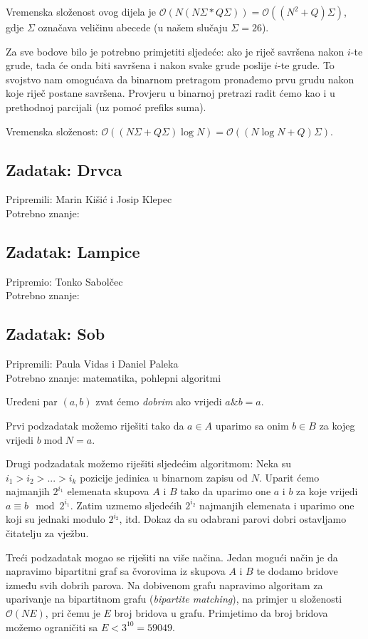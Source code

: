 \documentclass[a4paper]{article}
\begin{document}
Vremenska složenost ovog dijela je $\mathcal{O}(N(N\Sigma * Q\Sigma))=
\mathcal{O}((N^2 + Q)\Sigma)$, gdje $\Sigma$ označava veličinu abecede
(u našem slučaju $\Sigma=26$).

Za sve bodove bilo je potrebno primjetiti sljedeće: ako je riječ savršena nakon
$i$-te grude, tada će onda biti savršena i nakon svake grude poslije $i$-te
grude. To svojstvo nam omogućava da binarnom pretragom pronađemo prvu grudu
nakon koje riječ postane savršena. Provjeru u binarnoj pretrazi radit ćemo kao
i u prethodnoj parcijali (uz pomoć prefiks suma).

Vremenska složenost: $\mathcal{O}((N\Sigma + Q\Sigma)\log N) = \mathcal{O}((N \log N + Q)\Sigma)$.

\subsection*{Zadatak: Drvca}
\textsf{Pripremili: Marin Kišić i Josip Klepec}\\
\textsf{Potrebno znanje: }

\subsection*{Zadatak: Lampice}
\textsf{Pripremio: Tonko Sabolčec}\\
\textsf{Potrebno znanje: }

\subsection*{Zadatak: Sob}
\textsf{Pripremili: Paula Vidas i Daniel Paleka}\\
\textsf{Potrebno znanje: matematika, pohlepni algoritmi}

Uređeni par $(a, b)$ zvat ćemo \emph{dobrim} ako vrijedi $a \mathbin\& b = a$.

Prvi podzadatak možemo riješiti tako da $a \in A$ uparimo sa onim $b \in B$ za
kojeg vrijedi $b \mathbin{\textrm{mod}} N = a$.

Drugi podzadatak možemo riješiti sljedećim algoritmom: Neka su
$i_1 > i_2 > ... > i_k$ pozicije jedinica u binarnom zapisu od $N$. Uparit ćemo
najmanjih $2^{i_1}$ elemenata skupova $A$ i $B$ tako da uparimo one $a$ i $b$
za koje vrijedi $a \equiv b \mod 2^{i_1}$. Zatim uzmemo sljedećih $2^{i_2}$
najmanjih elemenata i uparimo one koji su jednaki modulo $2^{i_2}$, itd.
Dokaz da su odabrani parovi dobri ostavljamo čitatelju za vježbu.

Treći podzadatak mogao se riješiti na više načina. Jedan mogući način je da
napravimo bipartitni graf sa čvorovima iz skupova $A$ i $B$ te dodamo bridove
između svih dobrih parova. Na dobivenom grafu napravimo algoritam za uparivanje
na bipartitnom grafu (\emph{bipartite matching}), na primjer u složenosti
$\mathcal{O}(NE)$, pri čemu je $E$ broj bridova u grafu.
Primjetimo da broj bridova možemo ograničiti sa $E < 3^{10} = 59049$.
\end{document}
